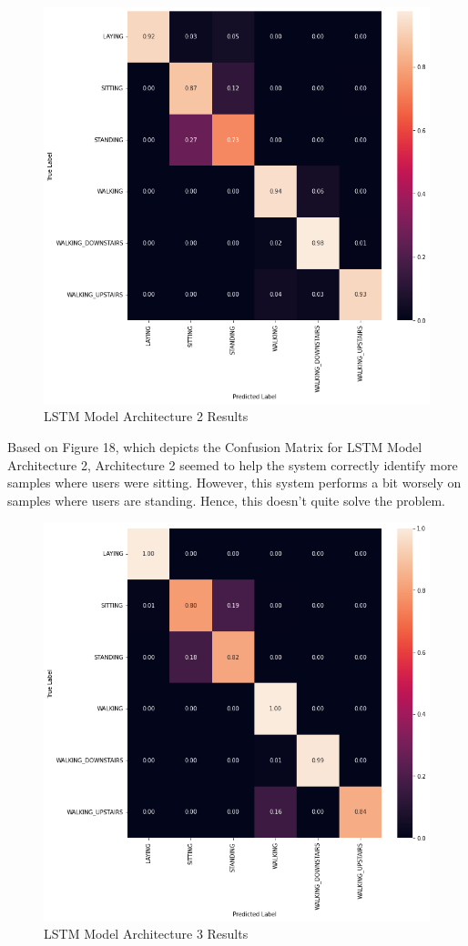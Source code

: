 \documentclass[conference]{IEEEtran}
\begin{document}
\begin{figure}[h!]
	\includegraphics[width= 0.9 \linewidth]{LSTM(2)_Results.png}
	\centering
	\caption{LSTM Model Architecture 2 Results}
	\label{LSTM(2)_Results.png}
\end{figure}

Based on Figure 18, which depicts the Confusion Matrix for LSTM Model Architecture 2, Architecture 2 seemed to help the system correctly identify more samples where users were sitting. However, this system performs a bit worsely on samples where users are standing. Hence, this doesn't quite solve the problem. 



\begin{figure}[h!]
	\includegraphics[width= 0.9 \linewidth]{LSTM(3)_Results.png}
	\centering
	\caption{LSTM Model Architecture 3 Results}
	\label{LSTM(3)_Results.png}
\end{figure}
\end{document}
